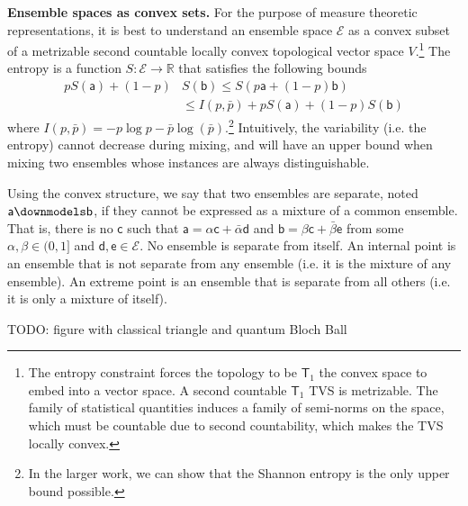 \documentclass[10pt,twocolumn, nofootinbib]{revtex4-2}
\newcommand{\ens}[1][e] {\mathsf{#1}} %
\newcommand{\Ens}[1][E] {\mathcal{#1}} %
\def\separate{\downmodels}
\begin{document}
\textbf{Ensemble spaces as convex sets.} For the purpose of measure theoretic representations, it is best to understand an ensemble space $\Ens$ as a convex subset of a metrizable second countable locally convex topological vector space $V$.\footnote{The entropy constraint forces the topology to be $\mathsf{T}_1$ the convex space to embed into a vector space. A second countable $\mathsf{T}_1$ TVS is metrizable. The family of statistical quantities induces a family of semi-norms on the space, which must be countable due to second countability, which makes the TVS locally convex.} The entropy is a function $S : \Ens \to \mathbb{R}$ that satisfies the following bounds
\begin{equation}
	\begin{aligned}
		p S(\ens[a]) + (1-p) &S(\ens[b]) \leq S(p \ens[a] + (1-p) \ens[b]) \\
		&\leq I(p,\bar{p}) + p S(\ens[a]) + (1-p) S(\ens[b])
	\end{aligned}
\end{equation}
where $I(p,\bar{p}) = - p \log p - \bar{p} \log(\bar{p})$.\footnote{In the larger work, we can show that the Shannon entropy is the only upper bound possible.}  Intuitively, the variability (i.e. the entropy) cannot decrease during mixing, and will have an upper bound when mixing two ensembles whose instances are always distinguishable.

Using the convex structure, we say that two ensembles are separate, noted $\ens[a] \separate \ens[b]$, if they cannot be expressed as a mixture of a common ensemble. That is, there is no $\ens[c]$ such that $\ens[a] = \alpha \ens[c] + \bar{\alpha} \ens[d]$ and $\ens[b] = \beta \ens[c] + \bar{\beta} \ens$ from some $\alpha, \beta \in (0,1]$ and $\ens[d],\ens \in \Ens$. No ensemble is separate from itself. An internal point is an ensemble that is not separate from any ensemble (i.e. it is the mixture of any ensemble). An extreme point is an ensemble that is separate from all others (i.e. it is only a mixture of itself).

TODO: figure with classical triangle and quantum Bloch Ball
\end{document}
